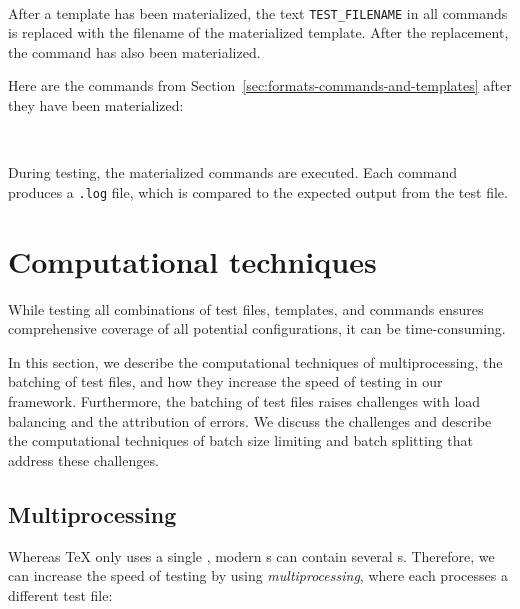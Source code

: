\documentclass[final]{ltugboat}
\begin{document}
\smallskip
\noindent
{} \\[0.4em]

\smallskip
\exampleSeparator

\smallskip
\noindent
{}

\smallskip

After a template has been materialized, the text \texttt{TEST\_FILENAME} in all commands is replaced with the filename of the materialized template. After the replacement, the command has also been materialized.

Here are the commands  from Section~\ref{sec:formats-commands-and-templates} after they have been materialized:

\smallskip
\noindent
{} \\[0.8em]

\smallskip

\noindent
During testing, the materialized commands are executed. Each command produces a \texttt{.log} file, which is compared to the expected output from the test file.

\section{Computational techniques}
\label{sec:computational-techniques}

While testing all combinations of test files, templates, and commands ensures comprehensive coverage of all potential configurations, it can be time-consuming.

In this section, we describe the computational techniques of multiprocessing, the batching of test files, and how they increase the speed of testing in our framework.
Furthermore, the batching of test files raises challenges with load balancing and the attribution of errors. We discuss the challenges and describe the computational techniques of batch size limiting and batch splitting that address these challenges.

\subsection{Multiprocessing}
\label{sec:multiprocessing}
Whereas \TeX{} only uses a single , modern s can contain several s. Therefore, we can increase the speed of testing by using \emph{multiprocessing}, where each  processes a different test file:
\end{document}
